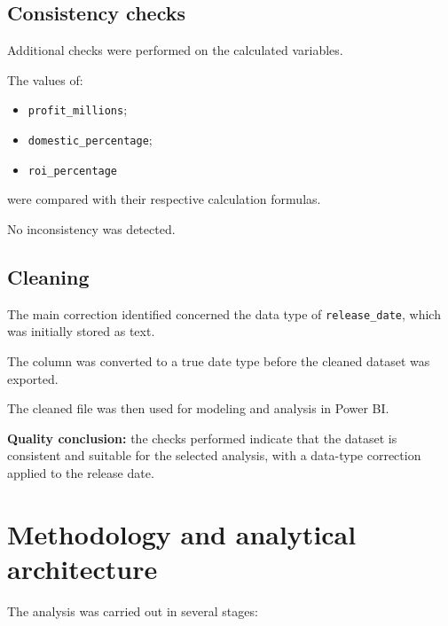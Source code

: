 \documentclass[a4paper,11pt]{article}
\newcommand{\varname}[1]{\texttt{#1}}
\begin{document}
\subsection{Consistency checks}

Additional checks were performed on the calculated variables.

The values of:
\begin{itemize}
  \item \varname{profit\_millions};
  \item \varname{domestic\_percentage};
  \item \varname{roi\_percentage}
\end{itemize}
were compared with their respective calculation formulas.

No inconsistency was detected.

\subsection{Cleaning}

The main correction identified concerned the data type of
\varname{release\_date}, which was initially stored as text.

The column was converted to a true date type before the cleaned dataset
was exported.

The cleaned file was then used for modeling and analysis in Power BI.

\textbf{Quality conclusion:} the checks performed indicate that the
dataset is consistent and suitable for the selected analysis, with a
data-type correction applied to the release date.

\section{Methodology and analytical architecture}

The analysis was carried out in several stages:
\end{document}
